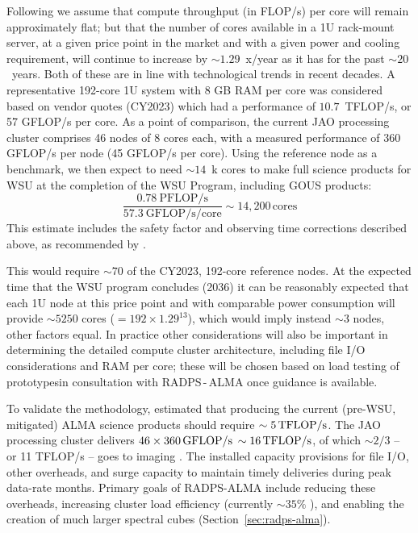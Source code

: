 Following \cite{computeCostTsi} we assume that compute 
throughput (in FLOP/s) per core will remain approximately flat; but that the number  of cores available in a 1U rack-mount server, at a given price point in the market and with a given power and cooling requirement, will
continue to increase by $\sim 1.29$~x/year as it has for the past $\sim 20$~years. Both of these are in line with technological trends in recent decades.
A representative 192-core 1U
system with 8 GB RAM per core was considered based on vendor quotes (CY2023) which had a performance of $10.7$~TFLOP/s, or 57 GFLOP/s per core. As a point of comparison, the current JAO processing cluster comprises 46 nodes of 8 cores each, with a measured performance of 360 GFLOP/s per node (45 GFLOP/s per core).
Using the \cite{computeCostTsi} reference node as a benchmark, we then expect to need $\sim 14$~k cores to make full science products for WSU at the completion of the WSU Program, including GOUS products:
\[
\frac{0.78~\mathrm{PFLOP/s}}{57.3~\mathrm{GFLOP/s/core}}  \sim 14,200 \, \mathrm{cores}
\]
This estimate includes the safety factor and observing time corrections described above, as recommended by  \cite{computeCostTsi}.

This would require $\sim 70$ of the CY2023, 192-core  
reference nodes. At the expected time that the WSU program concludes 
(2036) it can be reasonably expected that each 1U node at this price point and with comparable power consumption will provide $\sim 5250$ cores ($=192 \times 1.29^{13}$),
which would imply instead $\sim 3$ nodes, other factors equal. In practice other considerations will also be important in determining the detailed compute cluster architecture, including file I/O considerations and RAM
per core; these will be chosen based on load testing of prototypesin consultation with RADPS\,-\,ALMA once guidance is available. 

To validate the methodology, \cite{computeCostTsi} estimated that 
producing the current (pre-WSU, mitigated) ALMA science products should require $\sim 5\, {\rm TFLOP/s}$. The  JAO processing cluster delivers $46 \times 360 \, {\rm GFLOP/s}$ $ \sim 16 \, {\rm TFLOP/s}$, of which $\sim 2/3$ -- or 11 TFLOP/s -- goes to imaging \cite{computeCostTsi}.  The installed capacity provisions for file I/O,  other overheads,  and  surge capacity  to maintain  timely deliveries during peak data-rate months. Primary goals of RADPS-ALMA include  reducing these overheads, increasing cluster load efficiency (currently $\sim 35\%$ \cite{dpda}), and enabling the creation of much larger spectral cubes (Section~\ref{sec:radps-alma}).
